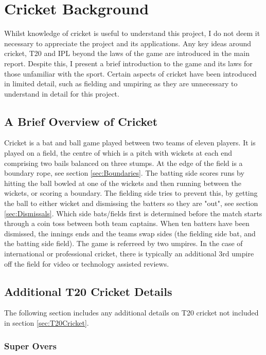 \documentclass[12pt,a4paper]{report}
\theoremstyle{definition}
\begin{document}
\chapter{Cricket Background} \label{chap:CrickBackground}

Whilst knowledge of cricket is useful to understand this project, I do not deem it necessary to appreciate the project and its applications.
Any key ideas around cricket, T20 and IPL beyond the laws of the game are introduced in the main report.
Despite this, I present a brief introduction to the game and its laws for those unfamiliar with the sport.
Certain aspects of cricket have been introduced in limited detail, such as fielding and umpiring as they are unnecessary to understand in detail for this project.

\section{A Brief Overview of Cricket}

Cricket is a bat and ball game played between two teams of eleven players. 
It is played on a field, the centre of which is a pitch with wickets at each end comprising two bails balanced on three stumps. 
At the edge of the field is a boundary rope, see section \ref{sec:Boundaries}. 
The batting side scores runs by hitting the ball bowled at one of the wickets and then running between the wickets, or scoring a boundary.
The fielding side tries to prevent this, by getting the ball to either wicket and dismissing the batters so they are "out", see section \ref{sec:Dismissals}.
Which side bats/fields first is determined before the match starts through a coin toss between both team captains.
When ten batters have been dismissed, the innings ends and the teams swap sides (the fielding side bat, and the batting side field).
The game is referreed by two umpires.
In the case of international or professional cricket, there is typically an additional 3rd umpire off the field for video or technology assisted reviews.

\section{Additional T20 Cricket Details} \label{sec:AdditionalT20Cricket}

The following section includes any additional details on T20 cricket not included in section \ref{sec:T20Cricket}.

\subsection{Super Overs}
\end{document}

